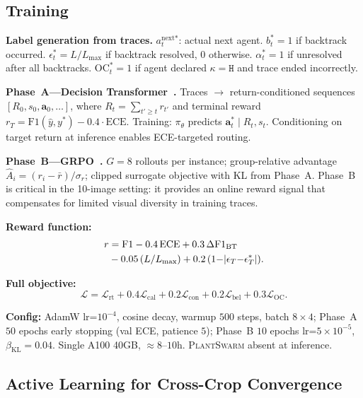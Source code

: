 \documentclass[11pt,twocolumn]{article}
\newcommand{\plantswarm}{\textsc{PlantSwarm}\xspace}
\newcommand{\kH}{\texttt{H}\xspace}
\begin{document}
\subsection{Training}

\textbf{Label generation from traces.}
$a^\text{next*}_t$: actual next agent.
$b_t^*{=}1$ if backtrack occurred.
$\epsilon_t^*{=}L/L_\text{max}$ if backtrack
resolved, $0$ otherwise.
$\alpha_t^*{=}1$ if unresolved after all
backtracks.
$\mathrm{OC}_t^*{=}1$ if agent declared
$\kappa{=}\kH$ and trace ended incorrectly.

\textbf{Phase~A---Decision
Transformer~\citep{chen2021decision}.}
Traces $\to$ return-conditioned sequences
$[R_0, s_0, \mathbf{a}_0, \ldots]$, where
$R_t{=}\sum_{t'\geq t}r_{t'}$ and terminal
reward $r_T{=}\text{F1}(\hat{y},y^*)
{-}0.4{\cdot}\text{ECE}$. Training:
$\pi_\theta$ predicts $\mathbf{a}^*_t \mid R_t, s_t$.
Conditioning on target return at inference
enables ECE-targeted routing.

\textbf{Phase~B---GRPO~\citep{guo2025deepseek}.}
$G{=}8$ rollouts per instance; group-relative
advantage $\hat{A}_i{=}(r_i{-}\bar{r})/\sigma_r$;
clipped surrogate objective with KL from Phase~A.
Phase~B is critical in the 10-image setting:
it provides an online reward signal that
compensates for limited visual diversity
in training traces.

\textbf{Reward function:}
\begin{align}
  r &= \text{F1} - 0.4\,\text{ECE}
  + 0.3\,\Delta\text{F1}_\text{BT} \notag\\
  &- 0.05\,(L/L_\text{max})
  + 0.2\,(1{-}|\epsilon_T{-}\epsilon^*_T|). \notag
\end{align}

\textbf{Full objective:}
\begin{equation*}\textstyle
\mathcal{L}{=}\mathcal{L}_\text{rt}
{+}0.4\mathcal{L}_\text{cal}{+}0.2\mathcal{L}_\text{con}
{+}0.2\mathcal{L}_\text{bel}{+}0.3\mathcal{L}_\text{OC}.
\end{equation*}

\textbf{Config:} AdamW lr=$10^{-4}$, cosine decay,
warmup $500$ steps, batch $8{\times}4$; Phase~A
$50$ epochs early stopping (val ECE, patience $5$);
Phase~B $10$ epochs lr=$5{\times}10^{-5}$,
$\beta_\text{KL}{=}0.04$. Single A100 40GB,
${\approx}8$--$10$h. \plantswarm absent at inference.

\subsection{Active Learning for Cross-Crop Convergence}
\end{document}
